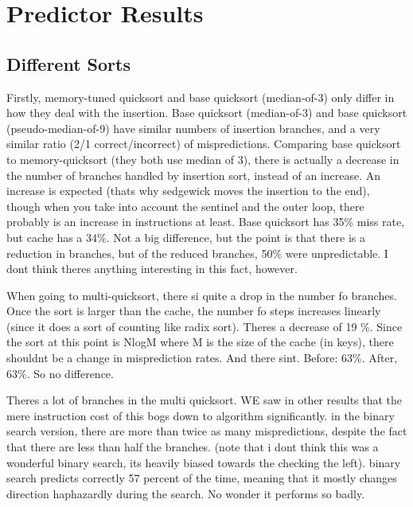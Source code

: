 \section{Predictor Results}

\subsection{Different Sorts}


Firstly, memory-tuned quicksort and base quicksort (median-of-3) only differ in how they deal with
the insertion. Base quicksort (median-of-3) and base quicksort
(pseudo-median-of-9) have similar numbers of insertion branches, and a very
similar ratio (2/1 correct/incorrect) of mispredictions. Comparing base
quicksort to memory-quicksort (they both use
median of 3), there is actually a decrease in the number of branches handled by
insertion sort, instead of an increase. An increase is expected (thats why
sedgewick moves the insertion to the end), though when you take into account
the sentinel and the outer loop, there probably is an increase in instructions
at least. Base quicksort has 35\% miss rate, but cache has a 34\%. Not a big
difference, but the point is that there is a reduction in branches, but of the
reduced branches, 50\% were unpredictable. I dont think theres anything
interesting in this fact, however.

When going to multi-quicksort, there si quite a drop in the number fo branches.
Once the sort is larger than the cache, the number fo steps increases linearly
(since it does a sort of counting like radix sort). Theres a decrease of 19 \%.
Since the sort at this point is NlogM where M is the size of the cache (in
keys), there shouldnt be a change in misprediction rates. And there sint.
Before: 63\%. After, 63\%. So no difference.

Theres a lot of branches in the multi quicksort. WE saw in other results that
the mere instruction cost of this bogs down to algorithm significantly. in the
binary search version, there are more than twice as many mispredictions,
despite the fact that there are less than half the branches. (note that i dont
think this was a wonderful binary search, its heavily biased towards the
checking the left). binary search predicts correctly 57 percent of the time,
meaning that it mostly changes direction haphazardly during the search. No
wonder it performs so badly.

